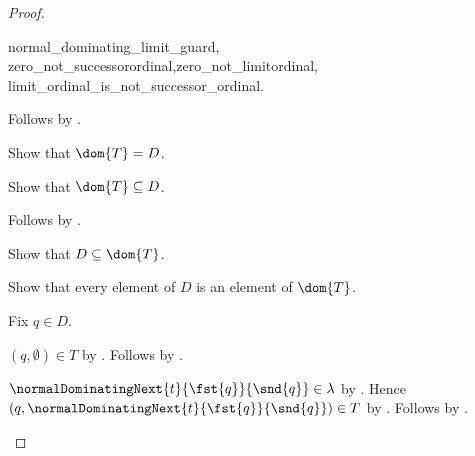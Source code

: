 \begin{proof}
\begin{subproof}
\begin{subproof}
{                    normal_dominating_limit_guard,
                    zero_not_successorordinal,zero_not_limitordinal,
                    limit_ordinal_is_not_successor_ordinal}.
        \end{subproof}
        Follows by .
    \end{subproof}
    Show that $\dom{T}=D$.
    \begin{subproof}
        Show that $\dom{T}\subseteq D$.
        \begin{subproof}
            Follows by .
        \end{subproof}
        Show that $D\subseteq\dom{T}$.
        \begin{subproof}
            Show that every element of $D$ is an element of $\dom{T}$.
            \begin{subproof}
                Fix $q\in D$.
                \begin{byCase}
                        $(q,\emptyset)\in T$ by
                            .
                        Follows by .
                        \begin{byCase}
                                $\normalDominatingNext{t}{\fst{q}}{\snd{q}}
                                    \in\lambda$ by
                                    .
                                Hence $(q,\normalDominatingNext{t}
                                        {\fst{q}}{\snd{q}})\in T$ by
                                    .
                                Follows by .
\end{byCase}
\end{byCase}
\end{subproof}
\end{subproof}
\end{subproof}
\end{proof}
